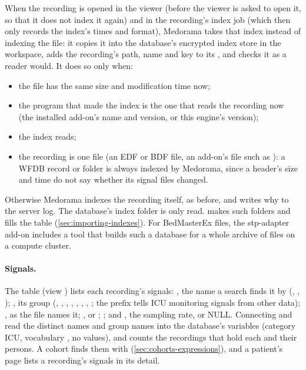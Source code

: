 When the recording is opened in the viewer (before the viewer is asked to open it, so that it
does not index it again) and in the recording's index job (which then only records the index's
times and format), Medorama takes that index instead of indexing the file: it copies it into the
database's encrypted index store in the workspace, adds the recording's path, name and key to its
, and checks it as a reader would. It does so only when:
\begin{itemize}
\item the file has the same size and modification time now;
\item the program that made the index is the one that reads the recording now (the installed
  add-on's name and version, or this engine's version);
\item the index reads;
\item the recording is one file (an EDF or BDF file, an add-on's file such as ): a
  WFDB record or folder is always indexed by Medorama, since a header's size and time do not say
  whether its signal files changed.
\end{itemize}
Otherwise Medorama indexes the recording itself, as before, and writes why to the server log.
The database's index folder is only read.  makes such folders and fills
the table (\cref{sec:importing-indexes}). For BedMasterEx  files, the stp-adapter
add-on includes a tool that builds such a database for a whole archive of  files on a
compute cluster.

\paragraph{Signals.} The table  (view ) lists each
recording's signals: , the name a search finds it by (,
, ); , its group (,
, , , , ,
, ; the prefix  tells ICU monitoring signals from other
data); , as the file names it; ,  or ;
; and , the sampling rate, or NULL. Connecting and  read the
distinct names and group names into the database's variables (category ICU, vocabulary
, no values), and  counts the recordings that hold each and their
persons. A cohort finds them with  (\cref{sec:cohorts-expressions}), and a
patient's page lists a recording's signals in its detail.

